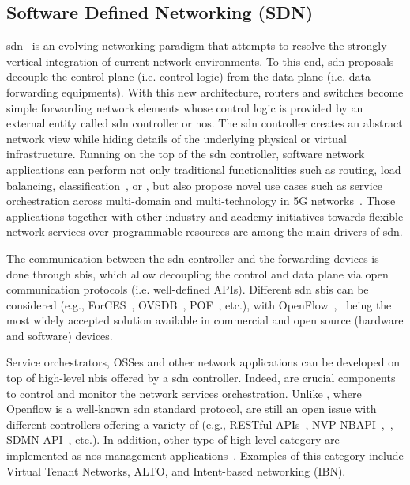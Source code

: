 \subsection{Software Defined Networking (SDN)}

\gls{sdn}~\cite{surveySDN} is an evolving networking paradigm that attempts to resolve the strongly vertical integration of current network environments. To this end, \gls{sdn} proposals decouple the control plane (i.e. control logic) from the data plane (i.e. data forwarding equipments). With this new architecture, routers and switches become simple forwarding network elements whose control logic is provided by an external entity called \gls{sdn} controller or \gls{nos}. The \gls{sdn} controller creates an abstract network view while hiding details of the underlying physical or virtual infrastructure. Running on the top of the \gls{sdn} controller, software network applications can perform not only traditional functionalities such as routing, load balancing, classification~\cite{6965141}, or , but also propose novel use cases such as service  orchestration across multi-domain and multi-technology in 5G networks~\cite{Bernardos20155GInfrastructures}. Those applications together with other industry and academy initiatives towards flexible network services over programmable resources are among the main drivers of \gls{sdn}.

The communication between the \gls{sdn} controller and the forwarding devices is done through \glspl{sbi}, which allow decoupling the control and data plane via open communication protocols (i.e. well-defined APIs). Different \gls{sdn} \glspl{sbi} can be considered (e.g., ForCES~\cite{Doria2010}, OVSDB~\cite{Davie2013RFCProtocol}, POF~\cite{song2013protocol}, etc.), with  OpenFlow~\cite{openFlow},~\cite{SDXCentral2014WhatAPIs} being the most widely accepted solution available in commercial and open source (hardware and software) devices. 

Service orchestrators, OSSes and other network applications can be developed on top of high-level \glspl{nbi} offered by a \gls{sdn} controller. Indeed,  are crucial components to control and monitor the network services orchestration. Unlike , where Openflow is a well-known \gls{sdn} standard protocol,  are still an open issue with different controllers offering a variety of  (e.g., RESTful APIs~\cite{richardson2008restful}, NVP NBAPI~\cite{onix},~\cite{koponen2014network}, SDMN API~\cite{pentikousis2013mobileflow}, etc.). In addition, other type of high-level  category are implemented as \gls{nos} management applications~\cite{Rotsos2017NetworkSurvey}. Examples of this category include Virtual Tenant Networks, ALTO, and Intent-based networking (IBN).

